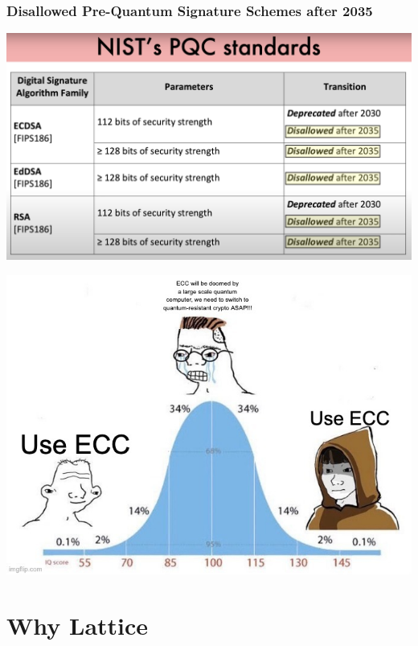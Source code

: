 \documentclass{beamer}
\begin{document}
\begin{frame}
\frametitle{Disallowed Pre-Quantum Signature Schemes after 2035}
\includegraphics[scale=0.24]{nistpqc.png}
\end{frame}

\begin{frame}
	\includegraphics[scale=0.5]{pqiq.jpg}

\end{frame}



\section{Why Lattice}
\end{document}
